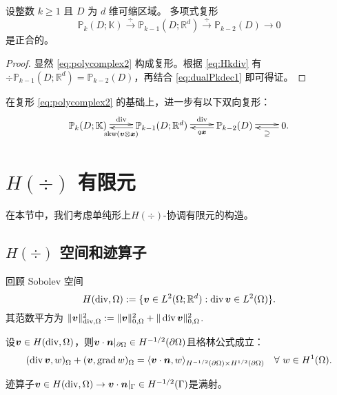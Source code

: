 \begin{lemma}
设整数 $k \geq 1$ 且 $D$ 为 $d$ 维可缩区域。 
多项式复形
\begin{equation}\label{eq:polycomplex2}
\mathbb P_k(D;\mathbb K)\xrightarrow{\div}\mathbb P_{k-1}(D;\mathbb R^d)\xrightarrow{\div}\mathbb P_{k-2}(D)\to0
\end{equation}
是正合的。
\end{lemma}
\begin{proof}
显然 \eqref{eq:polycomplex2} 构成复形。根据 \eqref{eq:Hkdiv} 有 $\div\mathbb P_{k-1}(D;\mathbb R^d)=\mathbb P_{k-2}(D)$，再结合 \eqref{eq:dualPkdec1} 即可得证。
\end{proof}

在复形 \eqref{eq:polycomplex2} 的基础上，进一步有以下双向复形：
\begin{equation*}
\xymatrix{
\mathbb P_{k}(D;\mathbb K)\ar@<0.4ex>[r]^-{\div}  & \mathbb P_{k-1}(D;\mathbb R^d)\ar@<0.4ex>[r]^-{\div}\ar@<0.4ex>[l]^-{\skw(\boldsymbol v\otimes\boldsymbol x)}  & \mathbb P_{k-2}(D) \ar@<0.4ex>[r]^-{}\ar@<0.4ex>[l]^-{ q\boldsymbol x} & 0 \ar@<0.4ex>[l]^-{ \supseteq}.
}
\end{equation*}


\section{$H(\div)$ 有限元}
在本节中，我们考虑单纯形上$H(\div)$-协调有限元的构造。

\subsection{$H(\div)$ 空间和迹算子}
回顾 Sobolev 空间
\[
H(\operatorname{div},\Omega):=\{\boldsymbol v\in L^2(\Omega;\mathbb R^d): \operatorname{div}\boldsymbol v\in L^2(\Omega)\}.
\]
其范数平方为 $\|\boldsymbol v\|_{\operatorname{div}, \Omega}^2:=\|\boldsymbol v\|_{0, \Omega}^2+\|\operatorname{div}\boldsymbol v\|_{0, \Omega}^2$.
\begin{lemma}
设$\boldsymbol v\in H(\operatorname{div},\Omega)$，则$\boldsymbol v\cdot\boldsymbol n|_{\partial\Omega}\in H^{-1/2}(\partial\Omega)$且格林公式成立：
\[
(\operatorname{div}\boldsymbol v, w)_{\Omega} + (\boldsymbol v, \operatorname{grad} w)_{\Omega}=\langle\boldsymbol v\cdot\boldsymbol n, w\rangle_{H^{-1/2}(\partial\Omega)\times H^{1/2}(\partial\Omega)}\quad\forall~w\in H^1(\Omega).
\]
\end{lemma}

\begin{lemma}
迹算子$\boldsymbol v\in H(\operatorname{div},\Omega)\to\boldsymbol v\cdot\boldsymbol n|_{\Gamma}\in H^{-1/2}(\Gamma)$是满射。
\end{lemma}

